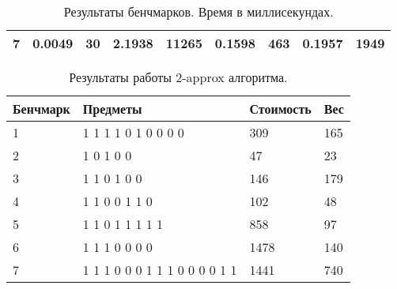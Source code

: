 \documentclass{article}
\begin{document}
\begin{table}[!h]
\begin{center}
\begin{tabular}{ | m{4.1em} | m{3em} | m{4.5em} | m{3em} | m{4.5em} | m{3em} | m{4.5em}| m{3em} | m{4.5em}|}
            \hline
            7        & 0.0049                               & 30                                      & 2.1938                                 & 11265                             & 0.1598 & 463       & 0.1957 & 1949      \\
            \hline
        \end{tabular}
        \caption{Результаты бенчмарков. Время в миллисекундах.}
    \end{center}
\end{table}

\begin{table}[!h]
    \begin{center}
        \begin{tabular}{ | m{4.1em} | m{15em} | m{4.5em} | m{4.5em} |}
            \hline
            Бенчмарк & Предметы                      & Стоимость & Вес \\
            \hline
            1        & 1 1 1 1 0 1 0 0 0 0           & 309       & 165 \\
            \hline
            2        & 1 0 1 0 0                     & 47        & 23  \\
            \hline
            3        & 1 1 0 1 0 0                   & 146       & 179 \\
            \hline
            4        & 1 1 0 0 1 1 0                 & 102       & 48  \\
            \hline
            5        & 1 1 0 1 1 1 1 1               & 858       & 97  \\
            \hline
            6        & 1 1 1 0 0 0 0                 & 1478      & 140 \\
            \hline
            7        & 1 1 1 0 0 0 1 1 1 0 0 0 0 1 1 & 1441      & 740 \\
            \hline
        \end{tabular}
        \caption{Результаты работы 2-approx алгоритма.}
    \end{center}
\end{table}
\end{document}
